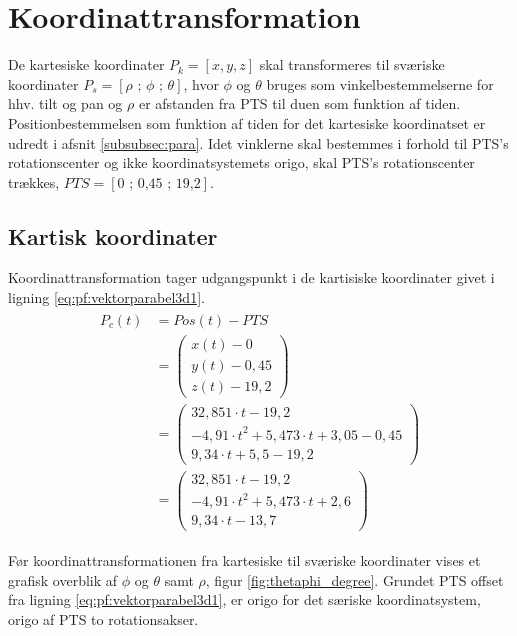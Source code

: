 \section{Koordinattransformation}
\label{sec:koordinattransformation}

De kartesiske koordinater \(P_k=[x, y, z]\) skal transformeres til sværiske koordinater \(P_s=[\rho \text{ ; } \phi \text{ ; } \theta]\), hvor \(\phi\) og \(\theta\) bruges som vinkelbestemmelserne for hhv. tilt og pan og \(\rho\) er afstanden fra PTS til duen som funktion af tiden.
Positionbestemmelsen som funktion af tiden for det kartesiske koordinatset er udredt i afsnit \ref{subsubsec:para}.
Idet vinklerne skal bestemmes i forhold til PTS's rotationscenter og ikke koordinatsystemets origo, skal PTS's rotationscenter trækkes, \(PTS=[\text{0 ; 0,45 ; 19,2}]\). 
\subsection{Kartisk koordinater}
Koordinattransformation tager udgangspunkt i de kartisiske koordinater givet i ligning \ref{eq:pf:vektorparabel3d1}. 
\begin{align}
\begin{split}
{ P }_{ c }\left( t \right) &=Pos\left( t \right) -PTS
\\
&=\left( \begin{matrix} x\left( t \right) -0 \\ y\left( t \right) -0,45 \\ z\left( t \right) -19,2 \end{matrix} \right) 
\\ 
&=\left( \begin{matrix} 32,851\cdot t-19,2 \\ -{ 4,91\cdot t }^{ 2 }+5,473\cdot t+3,05-0,45 \\ 9,34\cdot t+5,5-19,2 \end{matrix} \right) 
\\
&=\left( \begin{matrix} 32,851\cdot t-19,2 \\ -{ 4,91\cdot t }^{ 2 }+5,473\cdot t+2,6 \\ 9,34\cdot t-13,7 \end{matrix} \right) 
\label{eq:pf:vektorparabel3d1}
\end{split}
\end{align}

Før koordinattransformationen fra kartesiske til sværiske koordinater vises et grafisk overblik af \(\phi\) og \(\theta\) samt \(\rho\), figur \ref{fig:thetaphi_degree}. Grundet PTS offset fra ligning \ref{eq:pf:vektorparabel3d1}, er origo for det særiske koordinatsystem, origo af PTS to rotationsakser. 

